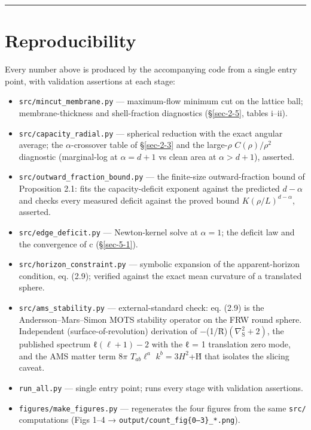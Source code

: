 \documentclass[12pt]{iopart}
\providecommand{\tightlist}{\setlength{\itemsep}{0pt}\setlength{\parskip}{0pt}}
\begin{document}
\begin{center}\rule{0.5\linewidth}{0.5pt}\end{center}

\section*{Reproducibility}\label{reproducibility}

Every number above is produced by the accompanying code from a single
entry point, with validation assertions at each stage:

\begin{itemize}
\tightlist
\item
  \texttt{src/mincut\_membrane.py} --- maximum-flow minimum cut on the
  lattice ball; membrane-thickness and shell-fraction diagnostics
  (§\ref{sec-2-5}, tables i--ii).
\item
  \texttt{src/capacity\_radial.py} --- spherical reduction with the
  exact angular average; the \(\alpha\)-crossover table of
  §\ref{sec-2-3} and the large-\(\rho\) \(C(\rho )/\rho ^{2}\)
  diagnostic (marginal-log at \(\alpha  = d + 1\) vs clean area at
  \(\alpha  > d + 1\)), asserted.
\item
  \texttt{src/outward\_fraction\_bound.py} --- the finite-size
  outward-fraction bound of Proposition 2.1: fits the capacity-deficit
  exponent against the predicted \(d - \alpha\) and checks every
  measured deficit against the proved bound \(K(\rho /L)^{d-\alpha }\),
  asserted.
\item
  \texttt{src/edge\_deficit.py} --- Newton-kernel solve at
  \(\alpha  = 1\); the deficit law and the convergence of c
  (§\ref{sec-5-1}).
\item
  \texttt{src/horizon\_constraint.py} --- symbolic expansion of the
  apparent-horizon condition, eq. (2.9); verified against the exact mean
  curvature of a translated sphere.
\item
  \texttt{src/ams\_stability.py} --- external-standard check: eq. (2.9)
  is the Andersson--Mars--Simon MOTS stability operator on the FRW round
  sphere. Independent (surface-of-revolution) derivation of
  −(1/R̄)\((\nabla ^{2}_{\mathrm{S}} + 2)\), the published spectrum
  ℓ\((\ell +1) - 2\) with the ℓ = 1 translation zero mode, and the AMS
  matter term \(8\pi\) \(T_{ab}\ell ^{a}\) \(k^{b} = 3H^{2}\)+Ḣ that
  isolates the slicing caveat.
\item
  \texttt{run\_all.py} --- single entry point; runs every stage with
  validation assertions.
\item
  \texttt{figures/make\_figures.py} --- regenerates the four figures
  from the same \texttt{src/} computations (Figs 1--4 →
  \texttt{output/count\_fig\{0–3\}\_*.png}).
\end{itemize}
\end{document}
